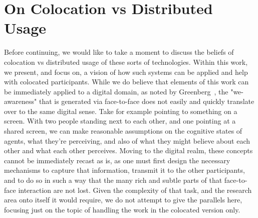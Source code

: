\section{On Colocation vs Distributed Usage}

Before continuing, we would like to take a moment to discuss the beliefs of
colocation vs distributed usage of these sorts of technologies. Within this
work, we present, and focus on, a vision of how such systems can be applied and
help with colocated participants. While we do believe that elements of this work
can be immediately applied to a digital domain, as noted by
Greenberg~\cite{greenberg_implications_2016}, the "we-awareness" that is
generated via face-to-face does not easily and quickly translate over to the
same digital sense. Take for example pointing to something on a screen. With two
people standing next to each other, and one pointing at a shared screen, we can
make reasonable assumptions on the cognitive states of agents, what they're
perceiving, and also of what they might believe about each other and what each
other perceives. Moving to the digital realm, these concepts cannot be
immediately recast as is, as one must first design the necessary mechanisms to
capture that information, transmit it to the other participants, and to do so in
such a way that the many rich and subtle parts of that face-to-face interaction
are not lost. Given the complexity of that task, and the research area onto
itself it would require, we do not attempt to give the parallels here, focusing
just on the topic of handling the work in the colocated version only.
